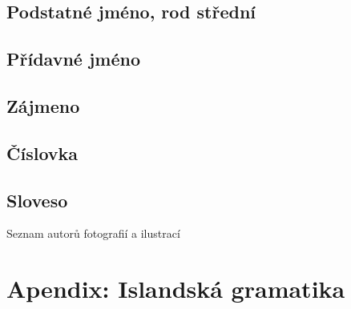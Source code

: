 \section{Podstatné jméno, rod střední}           \label{sec:morpho_n}
{\small{}}


\section{Přídavné jméno}                         \label{sec:morpho_adj}
{\small{}}


\section{Zájmeno}                                \label{sec:morpho_pron}


\section{Číslovka}                               \label{sec:morpho_num}
{\small{}}

\section{Sloveso}                                \label{sec:morpho_v}



\twocolumn
\pagestyle{empty}

\cleardoublepage
{}
{}
  {Seznam autorů fotografií a ilustrací}         \label{sec:photo}
\printindex

\cleardoublepage
{}
{}
\nocite{*}
\printbibliography

\onecolumn
\pagestyle{empty}

\chapter{Apendix: Islandská gramatika}
%

\cleardoublepage\null\clearpage %
\vfill
\EANisbn[SC3]

\cleardoublepage\null\clearpage %
\makecover\backcoverimages


